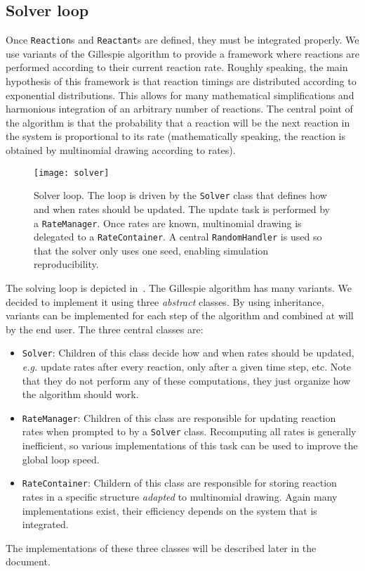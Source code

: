 
\subsection{Solver loop}

Once \texttt{Reaction}s and \texttt{Reactant}s are defined, they must be integrated properly. We use variants of the Gillespie algorithm to provide a framework where reactions are performed according to their current reaction rate. Roughly speaking, the main hypothesis of this framework is that reaction timings are distributed according to exponential distributions. This allows for many mathematical simplifications and harmonious integration of an arbitrary number of reactions. The central point of the algorithm is that the probability that a reaction will be the next reaction in the system is proportional to its rate (mathematically speaking, the reaction is obtained by multinomial drawing according to rates).

\begin{figure}[!h]
  \centering
  \texttt{[image: solver]}
  \caption{Solver loop. The loop is driven by the \texttt{Solver} class that defines how and when rates should be updated. The update task is performed by a \texttt{RateManager}. Once rates are known, multinomial drawing is delegated to a \texttt{RateContainer}. A central \texttt{RandomHandler} is used so that the solver only uses one seed, enabling simulation reproducibility.}
  \label{fig:solver}
\end{figure}

The solving loop is depicted in~. The Gillespie algorithm has many variants. We decided to implement it using three \emph{abstract} classes. By using inheritance, variants can be implemented for each step of the algorithm and combined at will by the end user. The three central classes are:
\begin{itemize}
  \item \texttt{Solver}: Children of this class decide how and when rates should be updated, \textit{e.g.} update rates after every reaction, only after a given time step, etc. Note that they do not perform any of these computations, they just organize how the algorithm should work.
  \item \texttt{RateManager}: Children of this class are responsible for updating reaction rates when prompted to by a \texttt{Solver} class. Recomputing all rates is generally inefficient, so various implementations of this task can be used to improve the global loop speed.
  \item \texttt{RateContainer}: Childern of this class are responsible for storing reaction rates in a specific structure \emph{adapted} to multinomial drawing. Again many implementations exist, their efficiency depends on the system that is integrated.
\end{itemize}
The implementations of these three classes will be described later in the document.


